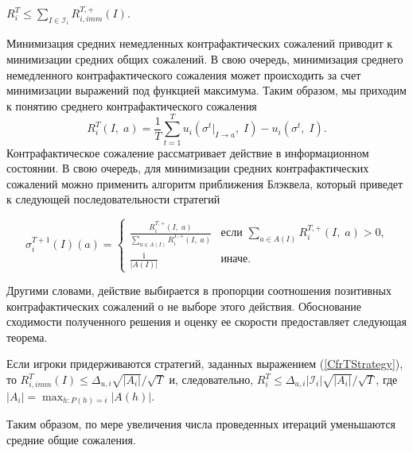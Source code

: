 \begin{theo} 
	$R_i^T \leq \sum_{I\in \mathcal{I}_i}R_{i,imm}^{T,+}(I)$\cite{NIPS07cfr}.
\end{theo}

Минимизация средних немедленных контрафактических сожалений приводит к минимизации средних общих сожалений. В свою очередь, минимизация среднего немедленного контрафактического сожаления может происходить за счет минимизации выражений под функцией максимума. Таким образом, мы приходим к понятию среднего контрафактического сожаления 
\begin{equation}
	R_i^T(I,\; a) = \frac{1}{T}\sum_{t=1}^{T}u_i(\sigma^t |_{I \to a},\;I)-u_i(\sigma^t,\;I).
\end{equation}
Контрафактическое сожаление рассматривает действие в информационном состоянии. В свою очередь, для минимизации средних контрафактических сожалений можно применить алгоритм приближения Блэквела\cite{RegretMatching}, который приведет к следующей последовательности стратегий 

\begin{equation}\label{CfrTStrategy}
	\sigma_i^{T+1}(I)(a)= 
	\begin{cases}
		\frac{R_i^{T,+}(I,\;a)}{\sum_{a\in A(I)}R_i^{T,+}(I,\;a)} &\text{если $\sum_{a\in A(I)}R_i^{T,+}(I,\;a) > 0$,}\\
		\frac{1}{|A(I)|} &\text{иначе.}
	\end{cases}
\end{equation}

Другими словами, действие выбирается в пропорции соотношения позитивных контрафактических сожалений о не выборе этого действия. Обоснование сходимости полученного решения и оценку ее скорости предоставляет следующая теорема. 

\begin{theo}\label{CfrTStrategyExp}
	 Если игроки придерживаются стратегий, заданных выражением (\ref{CfrTStrategy}), то $R_{i,imm}^T(I) \leq \Delta_{u,i}\sqrt{|A_i|}/\sqrt{T}$ и, следовательно, $R_i^T \leq \Delta_{u,i}|\mathcal{I}_i|\sqrt{|A_i|}/\sqrt{T}$, где $|A_i|=\max_{h\colon P(h)=i}|A(h)|$\cite{NIPS07cfr}.
\end{theo}

\par
Таким образом, по мере увеличения числа проведенных итераций уменьшаются средние общие сожаления.